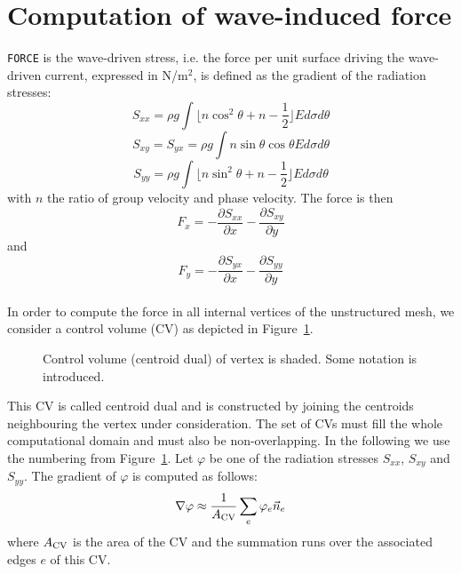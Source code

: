 \documentclass[12pt]{book}
\begin{document}
\section{Computation of wave-induced force}

{\tt FORCE} is the wave-driven stress, i.e. the force per unit surface driving the wave-driven current, expressed in N/m$^2$, is defined
as the gradient of the radiation stresses:
\begin{equation}
  S_{xx} = \rho g \int \lfloor n \cos^2\theta + n - \frac{1}{2} \rfloor E d\sigma d\theta
\end{equation}
\begin{equation}
  S_{xy} = S_{yx} = \rho g \int n \sin\theta \cos\theta E d\sigma d\theta
\end{equation}
\begin{equation}
  S_{yy} = \rho g \int \lfloor n \sin^2\theta + n - \frac{1}{2} \rfloor E d\sigma d\theta
\end{equation}
with $n$ the ratio of group velocity and phase velocity.
The force is then
\begin{equation}
  F_x = -\frac{\partial S_{xx}}{\partial x} - \frac{\partial S_{xy}}{\partial y}
\end{equation}
and
\begin{equation}
  F_y = -\frac{\partial S_{yx}}{\partial x} - \frac{\partial S_{yy}}{\partial y}
\end{equation}
\\[2ex]
\noindent
In order to compute the force in all internal vertices of the unstructured mesh, we consider a control volume (CV) as depicted in Figure~\ref{fig:cv}.
\begin{figure}[htb]
   \centerline{
              }
      \caption{Control volume (centroid dual) of vertex is shaded. Some notation is introduced.}
      \label{fig:cv}
\end{figure}
This CV is called centroid dual and is constructed by joining the centroids neighbouring the vertex under consideration. The set of CVs must fill
the whole computational domain and must also be non-overlapping.
In the following we use the numbering from Figure~\ref{fig:cv}.
Let $\varphi$ be one of the
radiation stresses $S_{xx}$, $S_{xy}$ and $S_{yy}$. The gradient of $\varphi$ is computed as follows:
\begin{equation}
  \nabla \varphi \approx \frac{1}{A_{\rm CV}} \sum_e \varphi_e \vec{n}_e
\end{equation}
where $A_{\rm CV}$ is the area of the CV and the summation runs over the associated edges $e$ of this CV.
\end{document}
